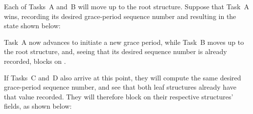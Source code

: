 \begin{center}
\end{center}

Each of Tasks~A and~B will move up to the root  structure.
Suppose that Task~A wins, recording its desired grace-period sequence
number and resulting in the state shown below:

\begin{center}
\end{center}

Task~A now advances to initiate a new grace period, while Task~B moves
up to the root  structure, and, seeing that its desired
sequence number is already recorded, blocks on .

\QuickQuizEnd

If Tasks~C and~D also arrive at this point, they will compute the same
desired grace-period sequence number, and see that both leaf
 structures already have that value recorded.
They will
therefore block on their respective  structures'
 fields, as shown below:

\begin{center}
\end{center}

